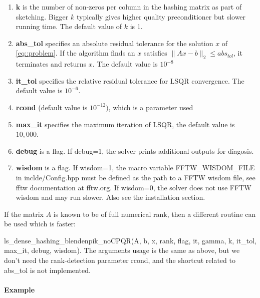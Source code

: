 \documentclass[english,11pt]{article}
\begin{document}
\begin{itemize}
\begin{enumerate}
			\item $\mathbf k$ is the number of non-zeros per column in the hashing matrix as part of sketching. Bigger $k$ typically gives higher quality preconditioner but slower running time. The default value of $k$ is 1. 

			\item {\bf abs_tol} specifies an absolute residual tolerance for the solution $x$ of \ref{eq::problem}. If the algorithm finds an $x$ satisfies $\|Ax-b\|_2 \leq abs_{tol}$, it terminates and returns $x$. The default value is $10^{-8}$

			\item {\bf it_tol} specifies the relative residual tolerance for LSQR convergence. The default value is $10^{-6}$.
			
			\item {\bf rcond} (default value is $10^{-12})$, which is a parameter used

			 \item {\bf max_it} specifies the maximum iteration of LSQR, the default value is $10,000$. 


			 \item {\bf debug} is a flag. If debug=1, the solver prints additional outputs for diagosis. 

			 \item {\bf wisdom} is a flag. If wisdom=1, the macro variable FFTW_WISDOM_FILE in inclde/Config.hpp must be defined as the path to a FFTW wisdom file, see fftw documentation at fftw.org. If wisdom=0, the solver does not use FFTW wisdom and may run slower. Also see the installation section.
		\end{enumerate}
		

	\end{itemize}


If the matrix $A$ is known to be of full numerical rank, then a different routine can be used which is faster:

ls_dense_hashing_blendenpik_noCPQR(A, b, x, rank, flag, it, gamma, k, it_tol, max_it, debug, wisdom). The arguments usage is the same as above, but we don't need the rank-detection parameter rcond, and the shortcut related to abs_tol is not implemented.

\paragraph{Example}
\end{document}
